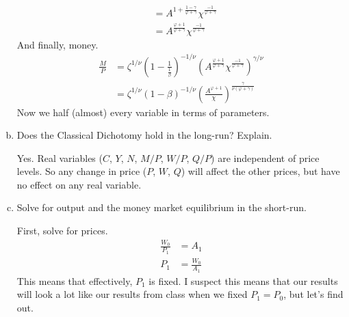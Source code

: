 \documentclass[answers]{exam}
\newcommand{\1}{\mathbf{1}}
\begin{document}
\begin{enumerate}[(a)]
\begin{solution}
\begin{align*}
            & = A^{1 + \frac{1 - \gamma}{\varphi + \gamma}}\chi^{\frac{-1}{\varphi + \gamma}} \\
            & = A^{\frac{\varphi + 1}{\varphi + \gamma}}\chi^{\frac{-1}{\varphi + \gamma}}
        \end{align*}
        And finally, money.
        \begin{align*}
            \frac{M}{P} & = \zeta^{1/\nu}\left(1-\frac{1}{\frac{1}{\beta}}\right)^{-1/\nu}\left(A^{\frac{\varphi + 1}{\varphi + \gamma}}\chi^{\frac{-1}{\varphi + \gamma}}\right)^{\gamma/\nu} \\
            & = \zeta^{1/\nu}\left(1-\beta\right)^{-1/\nu}\left(\frac{A^{\varphi + 1}}{\chi}\right)^{\frac{\gamma}{\nu(\varphi + \gamma)}}
        \end{align*}
        Now we half (almost) every variable in terms of parameters.
    \end{solution}
	\item Does the Classical Dichotomy hold in the long-run? Explain.
	\begin{solution}
        Yes. Real variables ($C$, $Y$, $N$, $M/P$, $W/P$, $Q/P$) are independent of price levels. So any change in price ($P$, $W$, $Q$) will affect the other prices, but have no effect on any real variable. 
    \end{solution}
	\item Solve for output and the money market equilibrium in the short-run.
	\begin{solution}
        First, solve for prices.
        \begin{align*}
            \frac{W_0}{P_1} & = A_1 \\
            P_1 & = \frac{W_0}{A_1}
        \end{align*}
        This means that effectively, $P_1$ is fixed. I suspect this means that our results will look a lot like our results from class when we fixed $P_1 = P_0$, but let's find out.
        

\end{solution}
\end{enumerate}
\end{document}

